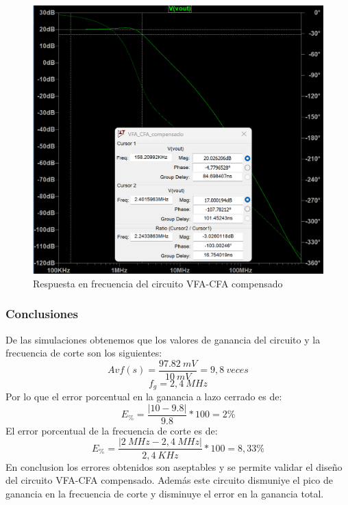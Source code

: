 \documentclass[a4paper,12pt]{article}
\begin{document}
\begin{figure}
    \centering
    \includegraphics[width=0.7\linewidth]{RTA_VFA-CFA-II.png}
    \caption{Respuesta en frecuencia del circuito VFA-CFA compensado}
    \label{fig:enter-label}
\end{figure}
\newpage
\subsubsection{Conclusiones}
\vspace{0.2cm}
\hspace{1mm}De las simulaciones obtenemos que los valores de ganancia del circuito y la frecuencia de corte son los siguientes:
\begin{equation}
    {Avf(s)=\frac{97.82~mV}{10~mV}}=9,8~veces
\end{equation}
\begin{equation}
f_g=2,4~MHz
\end{equation}
\vspace{0,2cm}
\hspace{1mm}Por lo que el error porcentual en la ganancia a lazo cerrado es de:
\begin{equation}
    E_\%=\frac{|10-9.8|}{9.8}*100=2\%
\end{equation}
\hspace{1mm}El error porcentual de la frecuencia de corte es de:
\begin{equation}
    E_\%=\frac{|2~MHz-2,4~MHz|}{2,4~KHz}*100=8,33\%
\end{equation}
\hspace{1mm}En conclusion los errores obtenidos son aseptables y se permite validar el diseño del circuito VFA-CFA compensado. Además este circuito dismuniye el pico de ganancia en la frecuencia de corte y disminuye el error en la ganancia total.\\
\end{document}
